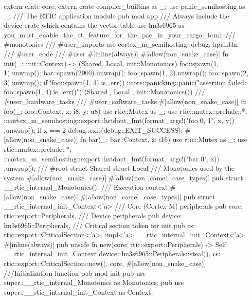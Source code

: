 extern crate core;
extern crate compiler_builtins as _;
use panic_semihosting as _;
/// The RTIC application module
pub mod app {
    /// Always include the device crate which contains the vector table
    use lm3s6965 as you_must_enable_the_rt_feature_for_the_pac_in_your_cargo_toml;
    /// #monotonics
    /// #user_imports
    use cortex_m_semihosting::{debug, hprintln};
    /// #user_code
    /// #user
    #[inline(always)]
    #[allow(non_snake_case)]
    fn init(_: init::Context) -> (Shared, Local, init::Monotonics) {
        foo::spawn(1, 1).unwrap();
        bar::spawn(2000).unwrap();
        foo::spawn(1, 2).unwrap();
        foo::spawn(2, 3).unwrap();
        if !foo::spawn(1, 4).is_err() {
            ::core::panicking::panic("assertion failed: foo::spawn(1, 4).is_err()")
        }
        (Shared {}, Local {}, init::Monotonics())
    }
    /// #user_hardware_tasks
    /// #user_software_tasks
    #[allow(non_snake_case)]
    fn foo(_: foo::Context, x: i8, y: u8) {
        use rtic::Mutex as _;
        use rtic::mutex::prelude::*;
        ::cortex_m_semihosting::export::hstdout_fmt(format_args!("foo {0}, {1}\n", x, y))
            .unwrap();
        if x == 2 {
            debug::exit(debug::EXIT_SUCCESS);
        }
    }
    #[allow(non_snake_case)]
    fn bar(_: bar::Context, z: i16) {
        use rtic::Mutex as _;
        use rtic::mutex::prelude::*;
        ::cortex_m_semihosting::export::hstdout_fmt(format_args!("bar {0}\n", z))
            .unwrap();
    }
    /// #root
    struct Shared {}
    struct Local {}
    /// Monotonics used by the system
    #[allow(non_snake_case)]
    #[allow(non_camel_case_types)]
    pub struct __rtic_internal_Monotonics();
    /// Execution context
    #[allow(non_snake_case)]
    #[allow(non_camel_case_types)]
    pub struct __rtic_internal_init_Context<'a> {
        /// Core (Cortex-M) peripherals
        pub core: rtic::export::Peripherals,
        /// Device peripherals
        pub device: lm3s6965::Peripherals,
        /// Critical section token for init
        pub cs: rtic::export::CriticalSection<'a>,
    }
    impl<'a> __rtic_internal_init_Context<'a> {
        #[inline(always)]
        pub unsafe fn new(core: rtic::export::Peripherals) -> Self {
            __rtic_internal_init_Context {
                device: lm3s6965::Peripherals::steal(),
                cs: rtic::export::CriticalSection::new(),
                core,
            }
        }
    }
    #[allow(non_snake_case)]
    ///Initialization function
    pub mod init {
        pub use super::__rtic_internal_Monotonics as Monotonics;
        pub use super::__rtic_internal_init_Context as Context;
}}
